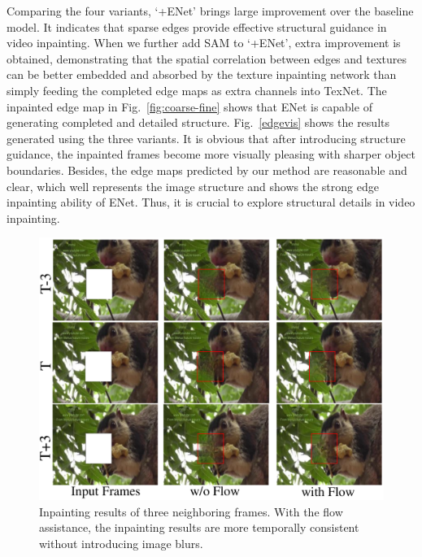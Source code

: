 Comparing the four variants, `+ENet' brings large improvement over the baseline model.
It indicates that sparse edges provide effective structural guidance in video inpainting.
When we further add SAM to `+ENet', extra improvement is obtained, demonstrating that the spatial correlation between edges and textures can be better embedded and absorbed by the texture inpainting network than simply feeding the completed edge maps as extra channels into TexNet.
The inpainted edge map in Fig.~\ref{fig:coarse-fine} shows that ENet is capable of generating completed and detailed structure.
Fig.~\ref{edgevis} shows the results generated using the three variants. 
It is obvious that after introducing structure guidance, the inpainted frames become more visually pleasing with sharper object boundaries. 
Besides, the edge maps predicted by our method are reasonable and clear, which well represents the image structure and shows the strong edge inpainting ability of ENet. 
Thus, it is crucial to explore structural details in video inpainting.




\begin{figure}[t]
	\centering
	\includegraphics[width=0.9\columnwidth]{flow_vis} %
	\caption{Inpainting results of three neighboring frames. With the flow assistance, the inpainting results are more temporally consistent without introducing image blurs. }
	\label{flow_vis}
\end{figure}

